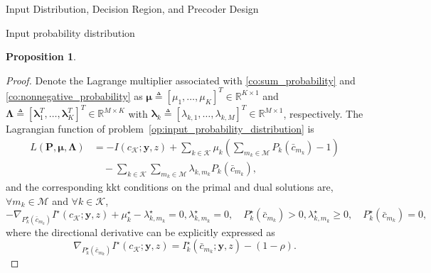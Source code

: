 \documentclass[journal]{IEEEtran}
\newtheorem{proposition}{Proposition}
\begin{document}
\begin{section}{Input Distribution, Decision Region, and Precoder Design}
\begin{subsection}{Input probability distribution}
\begin{proposition}
				\label{pr:optimal_conditions}
			\end{proposition}
			\begin{proof}
				Denote the Lagrange multiplier associated with \eqref{co:sum_probability} and \eqref{co:nonnegative_probability} as $\boldsymbol{\mu} \triangleq [\mu_1,\ldots,\mu_K]^T \in \mathbb{R}^{K \times 1}$ and $\boldsymbol{\Lambda} \triangleq [\boldsymbol{\lambda}_1^T,\ldots,\boldsymbol{\lambda}_K^T]^T \in \mathbb{R}^{M \times K}$ with $\boldsymbol{\lambda}_k \triangleq [\lambda_{k,1},\ldots,\lambda_{k,M}]^T \in \mathbb{R}^{M \times 1}$, respectively. The Lagrangian function of problem~\eqref{op:input_probability_distribution} is
				\begin{align}
					L(\boldsymbol{P},\boldsymbol{\mu},\boldsymbol{\Lambda})
					& = - I(c_{\mathcal{K}};\boldsymbol{y},z) + \sum_{k \in \mathcal{K}} \mu_k \left( \sum_{m_k \in \mathcal{M}} P_k(\bar{c}_{m_k}) - 1 \right)\nonumber\\
					& \quad - \sum_{k \in \mathcal{K}} \sum_{m_k \in \mathcal{M}} \lambda_{k,m_k} P_k(\bar{c}_{m_k}),
				\end{align}
				and the corresponding \gls{kkt} conditions on the primal and dual solutions are, $\forall m_k \in \mathcal{M}$ and $\forall k \in \mathcal{K}$,
				\begin{subequations}
					\begin{equation}
						- \nabla_{P_k^{\star}(\bar{c}_{m_k})} I^{\star}(c_{\mathcal{K}};\boldsymbol{y},z) + \mu_k^{\star} - \lambda_{k,m_k}^{\star} = 0,
					\end{equation}
					\begin{equation}
						\lambda_{k,m_k}^{\star} = 0, \quad P_k^{\star}(\bar{c}_{m_k}) > 0,
					\end{equation}
					\begin{equation}
						\lambda_{k,m_k}^{\star} \ge 0, \quad P_k^{\star}(\bar{c}_{m_k}) = 0,
					\end{equation}
				\end{subequations}
				where the directional derivative can be explicitly expressed as
				\begin{equation}
					\nabla_{P_k^{\star}(\bar{c}_{m_k})} I^{\star}(c_{\mathcal{K}};\boldsymbol{y},z) = I_k^{\star}(\bar{c}_{m_k};\boldsymbol{y},z) - (1 - \rho).
				\end{equation}


\end{proof}
\end{subsection}
\end{section}
\end{document}

